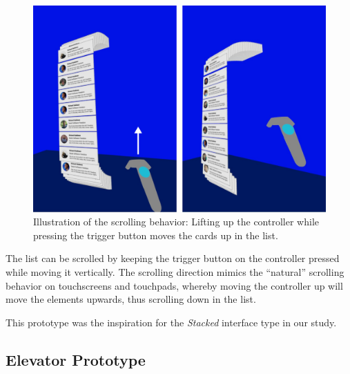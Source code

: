 \documentclass{tufte-book} %
\begin{document}
\begin{figure}
  \includegraphics{emailscroll.png}
  \caption{Illustration of the scrolling behavior: Lifting up the controller while pressing the trigger button moves the cards up in the list.}
  \label{fig:emailscroll}
\end{figure}

The list can be scrolled by keeping the trigger button on the controller pressed while moving it vertically. The scrolling direction mimics the ``natural'' scrolling behavior on touchscreens and touchpads, whereby moving the controller up will move the elements upwards, thus scrolling down in the list.

This prototype was the inspiration for the \emph{Stacked} interface type in our study.

\subsection{Elevator Prototype}
\end{document}
